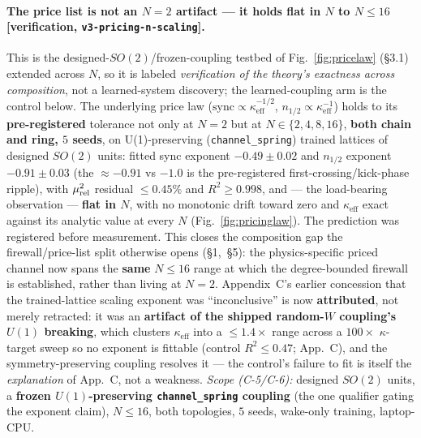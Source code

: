 \documentclass[11pt]{article}
\newcommand{\keff}{\kappa_{\mathrm{eff}}}
\begin{document}
\paragraph{The price list is not an $N=2$ artifact --- it holds flat in $N$ to $N\le16$ [verification, \texttt{v3-pricing-n-scaling}].} This is the designed-$SO(2)$/frozen-coupling testbed of Fig.~\ref{fig:pricelaw} (\S3.1) extended across $N$, so it is labeled \emph{verification of the theory's exactness across composition}, not a learned-system discovery; the learned-coupling arm is the control below. The underlying price law ($\text{sync}\propto\keff^{-1/2}$, $n_{1/2}\propto\keff^{-1}$) holds to its \textbf{pre-registered} tolerance not only at $N=2$ but at $N\in\{2,4,8,16\}$, \textbf{both chain and ring, $5$ seeds}, on U(1)-preserving (\texttt{channel\_spring}) trained lattices of designed $SO(2)$ units: fitted sync exponent $-0.49\pm0.02$ and $n_{1/2}$ exponent $-0.91\pm0.03$ (the $\approx-0.91$ vs $-1.0$ is the pre-registered first-crossing/kick-phase ripple), with $\mu_{\rm rel}^2$ residual $\le0.45\%$ and $R^2\ge0.998$, and --- the load-bearing observation --- \textbf{flat in $N$}, with no monotonic drift toward zero and $\keff$ exact against its analytic value at every $N$ (Fig.~\ref{fig:pricinglaw}). The prediction was registered before measurement. This closes the composition gap the firewall/price-list split otherwise opens (\S1,~\S5): the physics-specific priced channel now spans the \textbf{same} $N\le16$ range at which the degree-bounded firewall is established, rather than living at $N=2$. Appendix~C's earlier concession that the trained-lattice scaling exponent was ``inconclusive'' is now \textbf{attributed}, not merely retracted: it was an \textbf{artifact of the shipped random-$W$ coupling's $U(1)$ breaking}, which clusters $\keff$ into a $\le1.4\times$ range across a $100\times$ $\kappa$-target sweep so no exponent is fittable (control $R^2\le0.47$; App.~C), and the symmetry-preserving coupling resolves it --- the control's failure to fit is itself the \emph{explanation} of App.~C, not a weakness. \emph{Scope (C-5/C-6):} designed $SO(2)$ units, a \textbf{frozen $U(1)$-preserving \texttt{channel\_spring} coupling} (the one qualifier gating the exponent claim), $N\le16$, both topologies, $5$ seeds, wake-only training, laptop-CPU.
\end{document}
